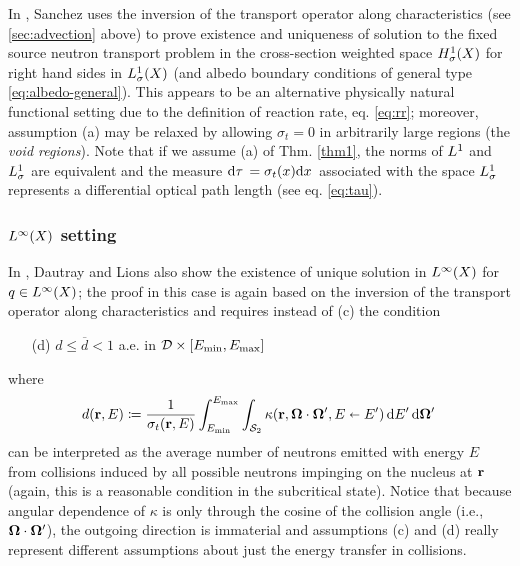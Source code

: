  In \cite{Sanchez3}, Sanchez uses the inversion of the transport operator along characteristics (see \ref{sec:advection}
 above) to prove existence and uniqueness of solution to the fixed source neutron transport problem in
 the cross-section weighted space $\Hp[1]_{\sigma}(X)$ for right hand sides in $\Lp[1]_{\sigma}(X)$ (and albedo
 boundary conditions of general type
 \eqref{eq:albedo-general}).%
 This appears to be an alternative physically natural functional setting due to the definition of reaction rate, eq. 
 \eqref{eq:rr}; moreover, assumption (a) may be relaxed by allowing $\sigma_t = 0$ in arbitrarily large regions 
  (the \textit{void regions}). Note that if we assume (a) of Thm. \ref{thm1}, the norms of $\Lp[1]$
  and $\Lp[1]_{\sigma}$ are equivalent and the measure $\d{\tau} = \sigma_t(x) \d{x}$ associated with the space
  $\Lp[1]_{\sigma}$ represents a differential optical path length (see eq. \eqref{eq:tau}).

\subsubsection{$\Lp[\infty](X)$ setting}
In \cite[Chap. XXI, \S 2, Proposition 6]{DautrayLions}, Dautray and Lions also 
show the existence of unique solution in $\Lp[\infty](X)$ for $q\in \Lp[\infty](X)$; the proof in this case is again
based on the inversion of the transport operator along characteristics and requires instead of
 (c) the condition
\begin{enumerate}
  \item[(d)] $d \leq \overline d < 1$ a.e. in $\VV\times[\Emin,\Emax]$
\end{enumerate}
where
\begin{equation}\label{eq:d} 
d(\br,E) \coloneqq 
  \frac{1}{\sigma_t(\br,E)}\int_{\Emin}^{\Emax}\int_{\Sphere} \kappa(\br,\bomega\cdot\bomega',
	    E\sla E')\,\d{E'}\d{\bomega'}
\end{equation}%
can be interpreted as the average number of neutrons emitted with energy $E$ from
collisions induced by all possible neutrons impinging on the nucleus at $\br$ (again, this is a reasonable condition
in the subcritical state). Notice that because angular dependence of $\kappa$ is only through the cosine of the
collision angle (i.e., $\bomega\cdot\bomega'$), the outgoing direction is immaterial and assumptions (c) and (d) really
represent different assumptions about just the energy transfer in collisions. 

